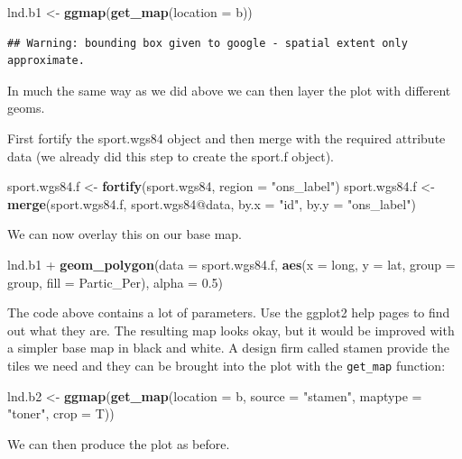 \documentclass[]{article}
\newenvironment{Shaded}{}{}
\newcommand{\KeywordTok}[1]{\textcolor[rgb]{0.00,0.44,0.13}{\textbf{{#1}}}}
\newcommand{\DataTypeTok}[1]{\textcolor[rgb]{0.56,0.13,0.00}{{#1}}}
\newcommand{\FloatTok}[1]{\textcolor[rgb]{0.25,0.63,0.44}{{#1}}}
\newcommand{\StringTok}[1]{\textcolor[rgb]{0.25,0.44,0.63}{{#1}}}
\newcommand{\NormalTok}[1]{{#1}}
\begin{document}
\begin{Shaded}
\begin{Highlighting}[]
\NormalTok{lnd.b1 <- }\KeywordTok{ggmap}\NormalTok{(}\KeywordTok{get_map}\NormalTok{(}\DataTypeTok{location =} \NormalTok{b))}
\end{Highlighting}
\end{Shaded}
\begin{verbatim}
## Warning: bounding box given to google - spatial extent only approximate.
\end{verbatim}
In much the same way as we did above we can then layer the plot with
different geoms.

First fortify the sport.wgs84 object and then merge with the required
attribute data (we already did this step to create the sport.f object).

\begin{Shaded}
\begin{Highlighting}[]
\NormalTok{sport.wgs84.f <- }\KeywordTok{fortify}\NormalTok{(sport.wgs84, }\DataTypeTok{region =} \StringTok{"ons_label"}\NormalTok{)}
\NormalTok{sport.wgs84.f <- }\KeywordTok{merge}\NormalTok{(sport.wgs84.f, sport.wgs84@data, }\DataTypeTok{by.x =} \StringTok{"id"}\NormalTok{, }\DataTypeTok{by.y =} \StringTok{"ons_label"}\NormalTok{)}
\end{Highlighting}
\end{Shaded}
We can now overlay this on our base map.

\begin{Shaded}
\begin{Highlighting}[]
\NormalTok{lnd.b1 + }\KeywordTok{geom_polygon}\NormalTok{(}\DataTypeTok{data =} \NormalTok{sport.wgs84.f, }\KeywordTok{aes}\NormalTok{(}\DataTypeTok{x =} \NormalTok{long, }\DataTypeTok{y =} \NormalTok{lat, }\DataTypeTok{group =} \NormalTok{group, }
    \DataTypeTok{fill =} \NormalTok{Partic_Per), }\DataTypeTok{alpha =} \FloatTok{0.5}\NormalTok{)}
\end{Highlighting}
\end{Shaded}
The code above contains a lot of parameters. Use the ggplot2 help pages
to find out what they are. The resulting map looks okay, but it would be
improved with a simpler base map in black and white. A design firm
called stamen provide the tiles we need and they can be brought into the
plot with the \texttt{get\_map} function:

\begin{Shaded}
\begin{Highlighting}[]
\NormalTok{lnd.b2 <- }\KeywordTok{ggmap}\NormalTok{(}\KeywordTok{get_map}\NormalTok{(}\DataTypeTok{location =} \NormalTok{b, }\DataTypeTok{source =} \StringTok{"stamen"}\NormalTok{, }\DataTypeTok{maptype =} \StringTok{"toner"}\NormalTok{, }
    \DataTypeTok{crop =} \NormalTok{T))}
\end{Highlighting}
\end{Shaded}
We can then produce the plot as before.
\end{document}
